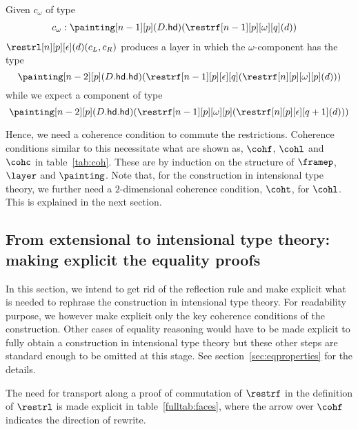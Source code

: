 \documentclass{msc}
\newcommand{\hd}{\ensuremath{\mathsf{hd}}}
\begin{document}
Given $c_\omega$ of type
\begin{align*}
  c_\omega & : \painting[n-1][p](D.\hd)(\restrf[n-1][p][\omega][q](d))
\end{align*}
$\restrl[n][p][\epsilon](d)(c_L, c_R)$ produces a layer in which the $\omega$-component has the type
\begin{equation*}
  \painting[n-2][p](D.\hd.\hd)(\restrf[n-1][p][\epsilon][q](\restrf[n][p][\omega][p](d)))
\end{equation*}
while we expect a component of type
\begin{equation*}
  \painting[n-2][p](D.\hd.\hd)(\restrf[n-1][p][\omega][p](\restrf[n][p][\epsilon][q+1](d)))
\end{equation*}

Hence, we need a coherence condition to commute the restrictions. Coherence conditions similar to this necessitate what are shown as, $\cohf$, $\cohl$ and $\cohc$ in table~\ref{tab:coh}. These are by induction on the structure of $\framep$, $\layer$ and $\painting$. Note that, for the construction in intensional type theory, we further need a $2$-dimensional coherence condition, $\coht$, for $\cohl$. This is explained in the next section.

\subsection{From extensional to intensional type theory: making explicit the equality proofs\label{sec:itt}}
In this section, we intend to get rid of the reflection rule and make explicit what is needed to rephrase the construction in intensional type theory. For readability purpose, we however make explicit only the key coherence conditions of the construction. Other cases of equality reasoning would have to be made explicit to fully obtain a construction in intensional type theory but these other steps are standard enough to be omitted at this stage. See section~\ref{sec:eqproperties} for the details.

The need for transport along a proof of commutation of $\restrf$ in the definition of $\restrl$ is made explicit in table~\ref{fulltab:faces}, where the arrow over $\cohf$ indicates the direction of rewrite. \\
\end{document}
